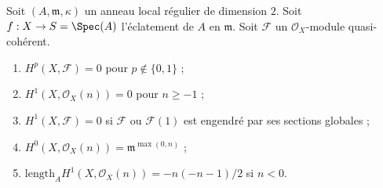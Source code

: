 \begin{lemma} \label{lemma-cohomology-of-blowup} Soit $(A, \mathfrak m, \kappa)$ un anneau local régulier de dimension $2$. Soit $f : X \to S = \Spec(A)$ l'éclatement de $A$ en $\mathfrak m$. Soit $\mathcal{F}$ un $\mathcal{O}_X$-module quasi-cohérent. \begin{enumerate} \item $H^p(X, \mathcal{F}) = 0$ pour $p \not \in \{0, 1\}$ ; \item $H^1(X, \mathcal{O}_X(n)) = 0$ pour $n \geq -1$ ; \item $H^1(X, \mathcal{F}) = 0$ si $\mathcal{F}$ ou $\mathcal{F}(1)$ est engendré par ses sections globales ; \item $H^0(X, \mathcal{O}_X(n)) = \mathfrak m^{\max(0, n)}$ ; \item $\text{length}_A H^1(X, \mathcal{O}_X(n)) = -n(-n - 1)/2$ si $n < 0$. \end{enumerate} \end{lemma}

